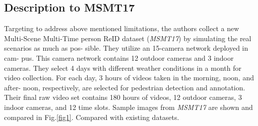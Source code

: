 \documentclass[10pt,twocolumn,letterpaper]{article}
\begin{document}
\subsection{Description to MSMT17}
Targeting to address above mentioned limitations, the authors
collect a new Multi-Scene Multi-Time person ReID dataset
(\textit{MSMT17}) by simulating the real scenarios as much as pos-
sible. They utilize an 15-camera network deployed in cam-
pus. This camera network contains 12 outdoor cameras and
3 indoor cameras. They select 4 days with different weather
conditions in a month for video collection. For each day,
3 hours of videos taken in the morning, noon, and after-
noon, respectively, are selected for pedestrian detection and
annotation. Their final raw video set contains 180 hours of
videos, 12 outdoor cameras, 3 indoor cameras, and 12 time
slots. Sample images from \textit{MSMT17} are shown and compared in
Fig.\ref{fig1}. Compared with existing datasets.
 

\end{document}
